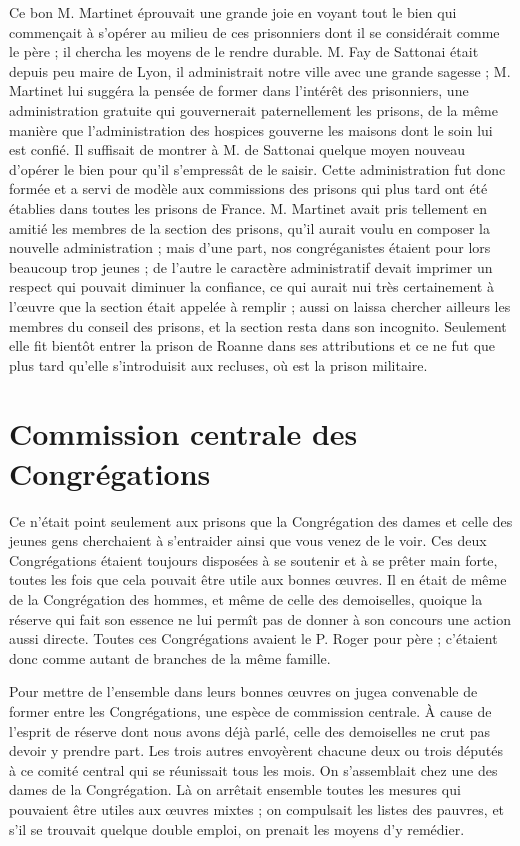 Ce bon M. Martinet éprouvait une grande joie en voyant tout le bien qui commençait à s'opérer au milieu de ces prisonniers dont il se considérait comme le père ; il chercha les moyens de le rendre durable. M. Fay de Sattonai était depuis peu maire de Lyon, il administrait notre ville avec une grande sagesse ; M. Martinet lui suggéra la pensée de former dans l'intérêt des prisonniers, une administration gratuite qui gouvernerait paternellement les prisons, de la même manière que l'administration des hospices gouverne les maisons dont le soin lui est confié. Il suffisait de montrer à M. de Sattonai quelque moyen nouveau d'opérer le bien pour qu'il s'empressât de le saisir. Cette administration fut donc formée et a servi de modèle aux commissions des prisons qui plus tard ont été établies dans toutes les prisons de France. M. Martinet avait pris tellement en amitié les membres de la section des prisons, qu'il aurait voulu en composer la nouvelle administration ; mais d'une part, nos congréganistes étaient pour lors beaucoup trop jeunes ; de l'autre le caractère administratif devait imprimer un respect qui pouvait diminuer la confiance, ce qui aurait nui très certainement à l'œuvre que la section était appelée à remplir ; aussi on laissa chercher ailleurs les membres du conseil des prisons, et la section resta dans son incognito. Seulement elle fit bientôt entrer la prison de Roanne dans ses attributions et ce
ne fut que plus tard qu'elle s'introduisit aux recluses, où est la prison militaire.

\section*{Commission centrale des Congrégations}
Ce n'était point seulement aux prisons que la Congrégation des dames et celle des jeunes gens cherchaient à s'entraider ainsi que vous venez de le voir. Ces deux Congrégations étaient toujours disposées à se soutenir et à se prêter main forte, toutes les fois que cela pouvait être utile aux bonnes œuvres. Il en était de même de la Congrégation des hommes, et même de celle des demoiselles, quoique la réserve qui fait son essence ne lui permît pas de donner à son concours une action aussi directe. Toutes ces Congrégations avaient le P. Roger pour père ; c'étaient donc comme autant de branches de la même famille.

Pour mettre de l'ensemble dans leurs bonnes œuvres on jugea convenable de former entre les Congrégations, une espèce de commission centrale. À cause de l'esprit de réserve dont nous avons déjà parlé, celle des demoiselles ne crut pas devoir y prendre part. Les trois autres envoyèrent chacune deux ou trois députés à ce comité central qui se réunissait tous les mois. On s'assemblait chez une des dames de la Congrégation. Là on arrêtait ensemble toutes les mesures qui pouvaient être utiles aux œuvres mixtes ; on compulsait les listes des pauvres, et s'il se trouvait quelque double emploi, on prenait les moyens d'y remédier.

